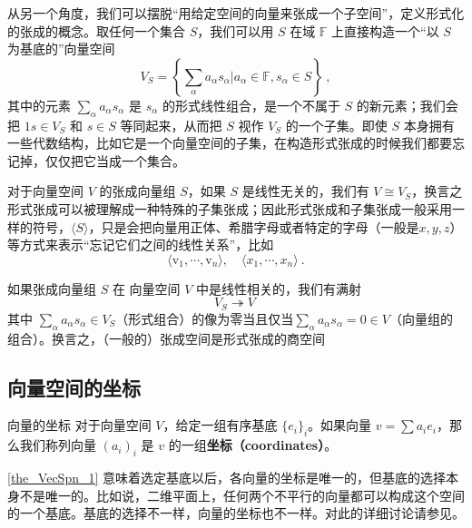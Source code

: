 从另一个角度，我们可以摆脱“用给定空间的向量来张成一个子空间”，定义形式化的张成的概念。取任何一个集合 $S$，我们可以用 $S$ 在域 $\mathbb{F}$ 上直接构造一个“以 $S$ 为基底的”向量空间
\begin{equation}
V_S = \left\{ \sum_\alpha a_\alpha s_\alpha|a_\alpha\in\mathbb{F}, s_\alpha\in S \right\}~,
\end{equation}
其中的元素 $\sum_\alpha a_\alpha s_\alpha$ 是 $s_\alpha$ 的形式线性组合，是一个不属于 $S$ 的新元素；我们会把 $1 s \in V_S$ 和 $s \in S$ 等同起来，从而把 $S$ 视作 $V_S$ 的一个子集。即使 $S$ 本身拥有一些代数结构，比如它是一个向量空间的子集，在构造形式张成的时候我们都要忘记掉，仅仅把它当成一个集合。

对于向量空间 $V$ 的张成向量组 $S$，如果 $S$ 是线性无关的，我们有 $V \cong V_S$，换言之形式张成可以被理解成一种特殊的子集张成；因此形式张成和子集张成一般采用一样的符号，$\langle S \rangle$，只是会把向量用正体、希腊字母或者特定的字母（一般是$x, y, z$）等方式来表示“忘记它们之间的线性关系”，比如
\begin{equation}
\langle \text{v}_1, \cdots, \text{v}_n \rangle, \quad \langle x_1, \cdots, x_n \rangle~.
\end{equation}

如果张成向量组 $S$ 在 向量空间 $V$ 中是线性相关的，我们有满射
\begin{equation}
V_S \twoheadrightarrow V ~
\end{equation}
其中 $\sum_\alpha a_\alpha s_\alpha \in V_S$（形式组合）的像为零当且仅当$\sum_\alpha a_\alpha s_\alpha = 0 \in V$（向量组的组合）。换言之，（一般的）张成空间是形式张成的商空间


\subsection{向量空间的坐标}



\begin{definition}{向量的坐标}
对于向量空间 $V$，给定一组有序基底 $\{e_i\}_i$。如果向量 $v=\sum a_i e_i$，那么我们称列向量 $(a_i)_i$ 是 $v$ 的一组\textbf{坐标（coordinates）}。
\end{definition}

\autoref{the_VecSpn_1} 意味着选定基底以后，各向量的坐标是唯一的，但基底的选择本身不是唯一的。比如说，二维平面上，任何两个不平行的向量都可以构成这个空间的一个基底。基底的选择不一样，向量的坐标也不一样。对此的详细讨论请参见。

